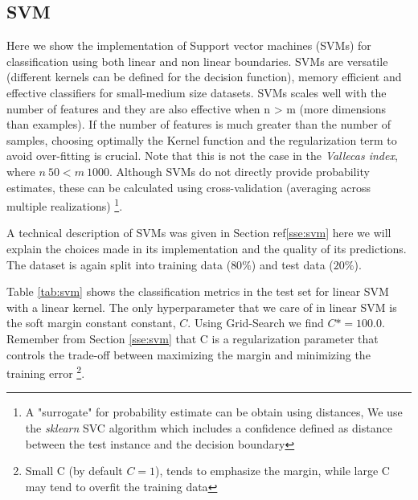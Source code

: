 \documentclass[11pt]{article}
\theoremstyle{definition}
\theoremstyle{remark}
\begin{document}

\subsection{SVM}
\label{se:ressvm}
Here we show the implementation of Support vector machines (SVMs) for classification using both linear and non linear boundaries. SVMs are versatile (different kernels can be defined for the decision function), memory efficient and effective classifiers for small-medium size datasets. SVMs scales well with the number of features and they are also effective when n > m (more dimensions than examples). If the number of features is much greater than the number of samples, choosing optimally the Kernel function and the regularization term to avoid over-fitting is crucial. Note that this is not the case in the \emph{Vallecas index}, where $n~50 < m~1000$. Although SVMs do not directly provide probability estimates, these can be calculated using cross-validation (averaging across multiple realizations) \footnote{A "surrogate" for probability estimate can be obtain using distances, We use the \emph{sklearn} SVC algorithm which includes a confidence defined as distance between the test instance and the decision boundary}.

A technical description of SVMs was given in Section ref\ref{sse:svm} here we will explain the choices made in its implementation and the quality of its predictions. 
The dataset is again split into training data ($80\%$) and test data ($20\%$). 

Table \ref{tab:svm} shows the classification metrics in the test set for linear SVM with a linear kernel. The only hyperparameter that we care of in linear SVM is the soft margin constant constant, $C$. Using Grid-Search we find $C* =100.0$. Remember from Section \ref{sse:svm} that C is a regularization parameter that controls the trade-off between maximizing the margin and minimizing the training error \footnote{Small C (by default $C=1$), tends to emphasize the margin, while large C may tend to overfit the training data}.
\end{document}
